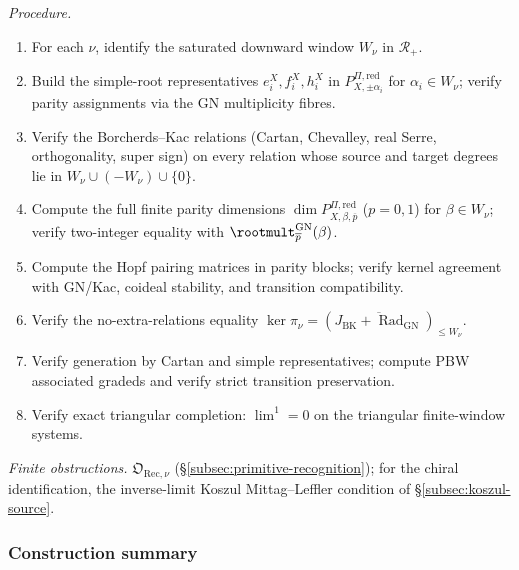 \textit{Procedure.}
\begin{enumerate}
\item For each $\nu$, identify the saturated downward window $W_\nu$
in $\mathcal R_+$.
\item Build the simple-root representatives $e_i^X,f_i^X,h_i^X$ in
$P^{\Pi,\mathrm{red}}_{X,\pm\alpha_i}$ for $\alpha_i\in W_\nu$; verify
parity assignments via the GN multiplicity fibres.
\item Verify the Borcherds--Kac relations (Cartan, Chevalley, real
Serre, orthogonality, super sign) on every relation whose source and
target degrees lie in $W_\nu\cup(-W_\nu)\cup\{0\}$.
\item Compute the full finite parity dimensions
$\dim P^{\Pi,\mathrm{red}}_{X,\beta,\overline p}$ ($p=0,1$) for
$\beta\in W_\nu$; verify two-integer equality with
$\rootmult_{\overline p}^{\mathrm{GN}}(\beta)$.
\item Compute the Hopf pairing matrices in parity blocks; verify
kernel agreement with GN/Kac, coideal stability, and transition
compatibility.
\item Verify the no-extra-relations equality
$\ker\pi_\nu=
(\overline{J_{\mathrm{BK}}+\operatorname{Rad}_{\mathrm{GN}}})_{\le W_\nu}$.
\item Verify generation by Cartan and simple representatives;
compute PBW associated gradeds and verify strict transition
preservation.
\item Verify exact triangular completion: $\lim^1=0$ on the
triangular finite-window systems.
\end{enumerate}

\textit{Finite obstructions.}  $\mathfrak O_{\mathrm{Rec},\nu}$
(\S\ref{subsec:primitive-recognition}); for the chiral
identification, the inverse-limit Koszul Mittag--Leffler condition
of \S\ref{subsec:koszul-source}.

\subsubsection*{Construction summary}

